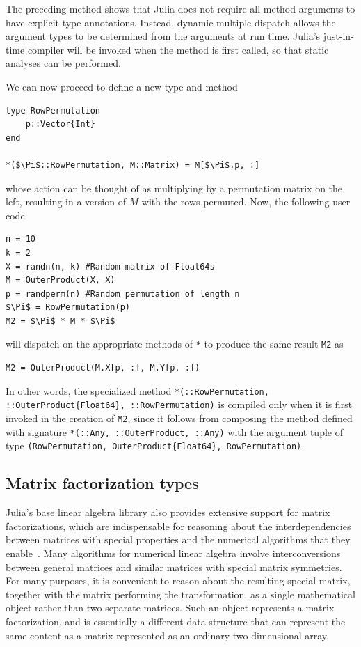 \documentclass[10pt, preprint]{sigplanconf}
\begin{document}
The preceding method shows that Julia does not require all method arguments to
have explicit type annotations. Instead, dynamic multiple dispatch allows the
argument types to be determined from the arguments at run time.
Julia's just-in-time compiler will be invoked when the method is first
called, so that static analyses can be performed.

We can now proceed to define a new type and method

\begin{lstlisting}
type RowPermutation
	p::Vector{Int}
end

*($\Pi$::RowPermutation, M::Matrix) = M[$\Pi$.p, :]
\end{lstlisting}
%
whose action can be thought of as multiplying by a permutation matrix on the
left, resulting in a version of $M$ with the rows permuted. Now, the following
user code
%
\begin{lstlisting}
n = 10
k = 2
X = randn(n, k) #Random matrix of Float64s
M = OuterProduct(X, X)
p = randperm(n) #Random permutation of length n
$\Pi$ = RowPermutation(p)
M2 = $\Pi$ * M * $\Pi$
\end{lstlisting}
%
will dispatch on the appropriate methods of \lstinline|*| to produce the same
result \lstinline|M2| as
\begin{lstlisting}
M2 = OuterProduct(M.X[p, :], M.Y[p, :])
\end{lstlisting}
%
In other words, the specialized method
\lstinline|*(::RowPermutation, ::OuterProduct{Float64}, ::RowPermutation)|
is compiled only when it is first invoked in the creation of
\lstinline|M2|, since it follows from composing the method defined with
signature \lstinline|*(::Any, ::OuterProduct, ::Any)| with the argument tuple
of type \lstinline|(RowPermutation, OuterProduct{Float64}, RowPermutation)|.

\subsection{Matrix factorization types}

Julia's base linear algebra library also provides extensive support for matrix
factorizations, which are indispensable for reasoning about the
interdependencies between matrices with special properties and the numerical
algorithms that they enable~\cite{Golub2013}. Many algorithms for numerical
linear algebra involve interconversions between general matrices and similar
matrices with special matrix symmetries. For many purposes, it is convenient to
reason about the resulting special matrix, together with the matrix performing
the transformation, as a single mathematical object rather than two separate
matrices. Such an object represents a matrix factorization, and is essentially
a different data structure that can represent the same content as a matrix
represented as an ordinary two-dimensional array.
\end{document}
